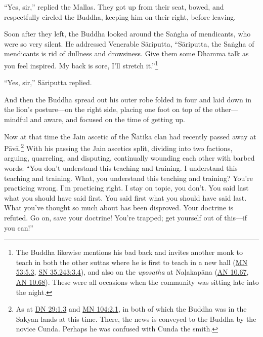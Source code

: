 \documentclass[12pt,openany]{book}%
\begin{document}
“Yes, sir,” replied the Mallas. They got up from their seat, bowed, and respectfully circled the Buddha, keeping him on their right, before leaving. 

Soon after they left, the Buddha looked around the \textsanskrit{Saṅgha} of mendicants, who were so very silent. He addressed Venerable \textsanskrit{Sāriputta}, “\textsanskrit{Sāriputta}, the \textsanskrit{Saṅgha} of mendicants is rid of dullness and drowsiness. Give them some Dhamma talk as you feel inspired. My back is sore, I’ll stretch it.”\footnote{The Buddha likewise mentions his bad back and invites another monk to teach in both the other suttas where he is first to teach in a new hall (\href{https://suttacentral.net/mn53/en/sujato\#5.3}{MN 53:5.3}, \href{https://suttacentral.net/sn35.243/en/sujato\#3.4}{SN 35.243:3.4}), and also on the \textit{uposatha} at \textsanskrit{Naḷakapāna} (\href{https://suttacentral.net/an10.67/en/sujato}{AN 10.67}, \href{https://suttacentral.net/an10.68/en/sujato}{AN 10.68}). These were all occasions when the community was sitting late into the night. } 

“Yes, sir,” \textsanskrit{Sāriputta} replied. 

And then the Buddha spread out his outer robe folded in four and laid down in the lion’s posture—on the right side, placing one foot on top of the other—mindful and aware, and focused on the time of getting up. 

Now at that time the Jain ascetic of the \textsanskrit{Ñātika} clan had recently passed away at \textsanskrit{Pāvā}.\footnote{As at \href{https://suttacentral.net/dn29/en/sujato\#1.3}{DN 29:1.3} and \href{https://suttacentral.net/mn104/en/sujato\#2.1}{MN 104:2.1}, in both of which the Buddha was in the Sakyan lands at this time. There, the news is conveyed to the Buddha by the novice Cunda. Perhaps he was confused with Cunda the smith. } With his passing the Jain ascetics split, dividing into two factions, arguing, quarreling, and disputing, continually wounding each other with barbed words: “You don’t understand this teaching and training. I understand this teaching and training. What, you understand this teaching and training? You’re practicing wrong. I’m practicing right. I stay on topic, you don’t. You said last what you should have said first. You said first what you should have said last. What you’ve thought so much about has been disproved. Your doctrine is refuted. Go on, save your doctrine! You’re trapped; get yourself out of this—if you can!” 
\end{document}
